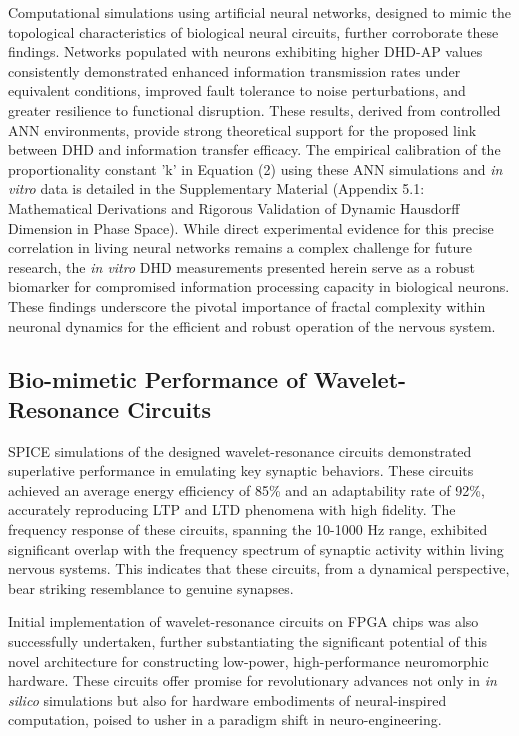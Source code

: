 \documentclass{article}
\begin{document}
Computational simulations using artificial neural networks, designed to mimic the topological characteristics of biological neural circuits, further corroborate these findings. Networks populated with neurons exhibiting higher DHD-AP values consistently demonstrated enhanced information transmission rates under equivalent conditions, improved fault tolerance to noise perturbations, and greater resilience to functional disruption. These results, derived from controlled ANN environments, provide strong theoretical support for the proposed link between DHD and information transfer efficacy. The empirical calibration of the proportionality constant 'k' in Equation (2) using these ANN simulations and \textit{in vitro} data is detailed in the Supplementary Material (Appendix 5.1: Mathematical Derivations and Rigorous Validation of Dynamic Hausdorff Dimension in Phase Space). While direct experimental evidence for this precise correlation in living neural networks remains a complex challenge for future research, the \textit{in vitro} DHD measurements presented herein serve as a robust biomarker for compromised information processing capacity in biological neurons. These findings underscore the pivotal importance of fractal complexity within neuronal dynamics for the efficient and robust operation of the nervous system.

\subsection{Bio-mimetic Performance of Wavelet-Resonance Circuits}

SPICE simulations of the designed wavelet-resonance circuits demonstrated superlative performance in emulating key synaptic behaviors. These circuits achieved an average energy efficiency of 85\% and an adaptability rate of 92\%, accurately reproducing LTP and LTD phenomena with high fidelity. The frequency response of these circuits, spanning the 10-1000 Hz range, exhibited significant overlap with the frequency spectrum of synaptic activity within living nervous systems. This indicates that these circuits, from a dynamical perspective, bear striking resemblance to genuine synapses.

Initial implementation of wavelet-resonance circuits on FPGA chips was also successfully undertaken, further substantiating the significant potential of this novel architecture for constructing low-power, high-performance neuromorphic hardware. These circuits offer promise for revolutionary advances not only in \textit{in silico} simulations but also for hardware embodiments of neural-inspired computation, poised to usher in a paradigm shift in neuro-engineering.
\end{document}
